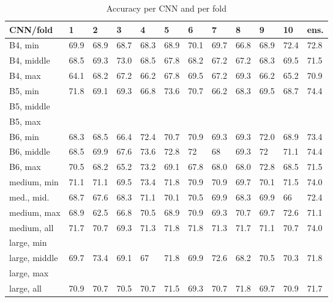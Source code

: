 \documentclass[10pt,letterpaper]{article}
\begin{document}
\begin{table}[!ht]
    \centering
    \caption{Accuracy per CNN and per fold}
    \begin{tabular}{|l|l|l|l|l|l|l|l|l|l|l|l|}
    \hline
        CNN/fold & 1 & 2 & 3 & 4 & 5 & 6 & 7 & 8 & 9 & 10 & ens. \\ \hline
        B4, min & 69.9 & 68.9 & 68.7 & 68.3 & 68.9 & 70.1 & 69.7 & 66.8 & 68.9 & 72.4 & 72.8 \\ \hline
        B4, middle & 68.5 & 69.3 & 73.0 & 68.5 & 67.8 & 68.2 & 67.2 & 67.2 & 68.3 & 69.5 & 71.5 \\ \hline
        B4, max & 64.1 & 68.2 & 67.2 & 66.2 & 67.8 & 69.5 & 67.2 & 69.3 & 66.2 & 65.2 & 70.9 \\ \hline
        B5, min & 71.8 & 69.1 & 69.3 & 66.8 & 73.6 & 70.7 & 66.2 & 68.3 & 69.5 & 68.7 & 74.4 \\ \hline
        B5, middle & ~ & ~ & ~ & ~ & ~ & ~ & ~ & ~ & ~ & ~ & ~ \\ \hline
        B5, max & ~ & ~ & ~ & ~ & ~ & ~ & ~ & ~ & ~ & ~ & ~ \\ \hline
        B6, min & 68.3 & 68.5 & 66.4 & 72.4 & 70.7 & 70.9 & 69.3 & 69.3 & 72.0 & 68.9 & 73.4 \\ \hline
        B6, middle & 68.5 & 69.9 & 67.6 & 73.6 & 72.8 & 72 & 68 & 69.3 & 72 & 71.1 & 74.4 \\ \hline
        B6, max & 70.5 & 68.2 & 65.2 & 73.2 & 69.1 & 67.8 & 68.0 & 68.0 & 72.8 & 68.5 & 71.5 \\ \hline
        medium, min & 71.1 & 71.1 & 69.5 & 73.4 & 71.8 & 70.9 & 70.9 & 69.7 & 70.1 & 71.5 & 74.0 \\ \hline
        med., mid. & 68.7 & 67.6 & 68.3 & 71.1 & 70.1 & 70.5 & 69.9 & 68.3 & 69.9 & 66 & 72.4 \\ \hline
        medium, max & 68.9 & 62.5 & 66.8 & 70.5 & 68.9 & 70.9 & 69.3 & 70.7 & 69.7 & 72.6 & 71.1 \\ \hline
        medium, all & 71.7 & 70.7 & 69.3 & 71.3 & 71.8 & 71.8 & 71.3 & 71.7 & 71.1 & 70.7 & 74.0 \\ \hline
        large, min & ~ & ~ & ~ & ~ & ~ & ~ & ~ & ~ & ~ & ~ & ~ \\ \hline
        large, middle & 69.7 & 73.4 & 69.1 & 67 & 71.8 & 69.9 & 72.6 & 68.2 & 70.5 & 70.3 & 71.8 \\ \hline
        large, max & ~ & ~ & ~ & ~ & ~ & ~ & ~ & ~ & ~ & ~ & ~ \\ \hline
        large, all & 70.9 & 70.7 & 70.5 & 70.7 & 71.5 & 69.3 & 70.7 & 71.8 & 69.7 & 70.9 & 71.7 \\ \hline
    \end{tabular}
\label{table9}    
\end{table}
\end{document}
